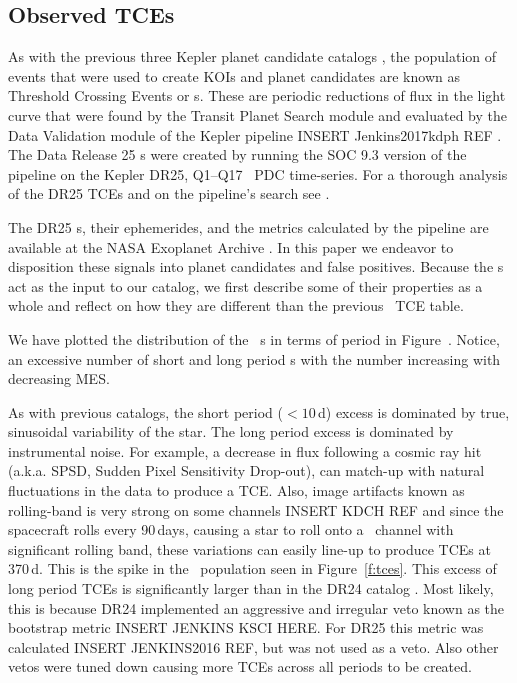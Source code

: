 \subsection{Observed TCEs}

\label{s:tces}
As with the previous three Kepler planet candidate catalogs \citep{Coughlin2016,Mullally2015cat,Rowe2015cat}, the population of events that were used to create KOIs and planet candidates are known as Threshold Crossing Events or \opstce s.  These are periodic reductions of flux in the light curve that were found by the Transit Planet Search module and evaluated by the Data Validation module of the Kepler pipeline INSERT Jenkins2017kdph REF \citep{Fanelli2011}.   The Data Release 25 \opstce s were created by running the SOC 9.3 version of the pipeline on the Kepler DR25, Q1--Q17 \Kepler\ PDC time-series.  For a thorough analysis of the DR25 TCEs and on the pipeline's search see \citet{Twicken2016}.  

The DR25 \opstce s, their ephemerides, and the metrics calculated by the pipeline are available at the NASA Exoplanet Archive \citep{Akeson2013}.  In this paper we endeavor to disposition these signals into planet candidates and false positives.   Because the \opstce s act as the input to our catalog, we first describe some of their properties as a whole and reflect on how they are different than the previous \Kepler\ TCE table.

We have plotted the distribution of the \ntcesnorogue\ \opstce s in terms of period in Figure~\label{f:tces}. Notice, an excessive number of short and long period \opstce s with the number increasing with decreasing MES. 

As with previous catalogs, the short period ($<10$\,d) excess is dominated by true, sinusoidal variability of the star. The long period excess is dominated by instrumental noise. For example, a decrease in flux following a cosmic ray hit (a.k.a. SPSD, Sudden Pixel Sensitivity Drop-out), can match-up with natural fluctuations in the data to produce a TCE. Also, image artifacts known as rolling-band is very strong on some channels INSERT KDCH REF\citep[see page][]{KDCH}  and since the spacecraft rolls every 90\,days, causing a star to roll onto a \Kepler\ channel with significant rolling band, these variations can easily line-up to produce TCEs at 370\,d. This is the spike in the \opstce\ population seen in Figure~\ref{f:tces}. This excess of long period TCEs is significantly larger than in the DR24 catalog \citep{Seader2015}. Most likely, this is because DR24 implemented an aggressive and irregular veto known as the bootstrap metric \citep{}INSERT JENKINS KSCI HERE.  For DR25 this metric was calculated INSERT JENKINS2016 REF, but was not used as a veto.  Also other vetos were tuned down causing more TCEs across all periods to be created.  %

